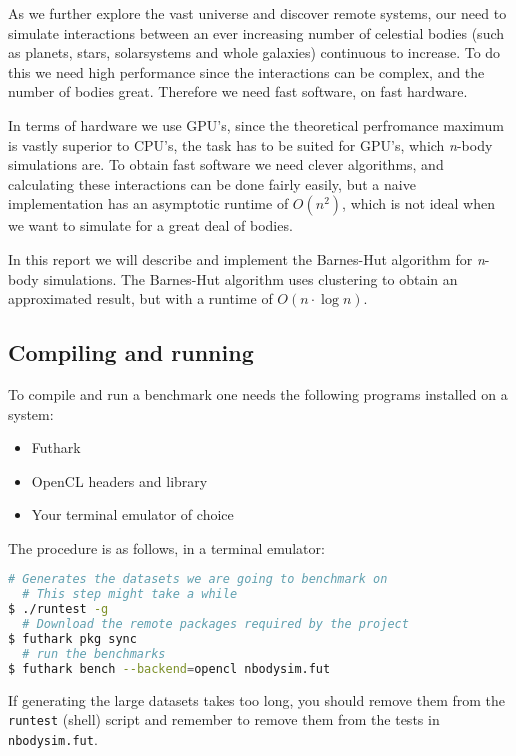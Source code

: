 As we further explore the vast universe and discover remote systems, our need to
simulate interactions between an ever increasing number of celestial bodies
(such as planets, stars, solarsystems and whole galaxies) continuous to increase.
To do this we need high performance since the interactions can be complex, and
the number of bodies great. Therefore we need fast software, on fast hardware.

In terms of hardware we use GPU's, since the theoretical perfromance maximum
is vastly superior to CPU's, the task has to be suited for GPU's, which
\textit{n}-body simulations are. To obtain fast software we need clever algorithms,
and calculating these interactions can be done fairly easily, but a naive
implementation has an asymptotic runtime of $O(n^2)$, which is not ideal when we
want to simulate for a great deal of bodies.

In this report we will describe and implement the Barnes-Hut algorithm for
\textit{n}-body simulations. The Barnes-Hut algorithm uses clustering to obtain
an approximated result, but with a runtime of $O(n \cdot \log{n})$.

\subsection{Compiling and running}
To compile and run a benchmark one needs the following programs
installed on a system:

\begin{itemize}
  \item Futhark
  \item OpenCL headers and library
  \item Your terminal emulator of choice
\end{itemize}

The procedure is as follows, in a terminal emulator: \\
\begin{lstlisting}[language=bash]
  # Generates the datasets we are going to benchmark on
  # This step might take a while
$ ./runtest -g
  # Download the remote packages required by the project
$ futhark pkg sync
  # run the benchmarks
$ futhark bench --backend=opencl nbodysim.fut
\end{lstlisting}

If generating the large datasets takes too long, you should remove them from the
\texttt{runtest} (shell) script and remember to remove them from the tests in
\texttt{nbodysim.fut}.

